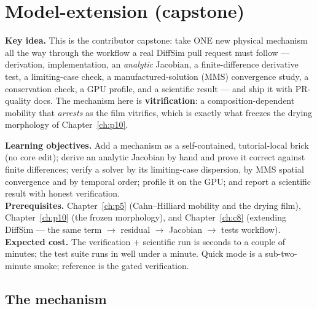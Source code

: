 \chapter{Model-extension (capstone)}
\label{ch:p11}

\begin{keybox}
\textbf{Key idea.} This is the contributor capstone: take ONE new physical
mechanism all the way through the workflow a real DiffSim pull request must
follow --- derivation, implementation, an \emph{analytic} Jacobian, a
finite-difference derivative test, a limiting-case check, a
manufactured-solution (MMS) convergence study, a conservation check, a GPU
profile, and a scientific result --- and ship it with PR-quality docs. The
mechanism here is \textbf{vitrification}: a composition-dependent mobility that
\emph{arrests} as the film vitrifies, which is exactly what freezes the drying
morphology of Chapter~\ref{ch:p10}.
\end{keybox}

\begin{keybox}
\textbf{Learning objectives.} Add a mechanism as a self-contained,
tutorial-local brick (no core edit); derive an analytic Jacobian by hand and
prove it correct against finite differences; verify a solver by its
limiting-case dispersion, by MMS spatial convergence and by temporal order;
profile it on the GPU; and report a scientific result with honest
verification.\\[2pt]
\textbf{Prerequisites.} Chapter~\ref{ch:p5} (Cahn--Hilliard mobility and the
drying film), Chapter~\ref{ch:p10} (the frozen morphology), and
Chapter~\ref{ch:c8} (extending DiffSim --- the same term $\rightarrow$ residual
$\rightarrow$ Jacobian $\rightarrow$ tests workflow).\\[2pt]
\textbf{Expected cost.} The verification + scientific run is seconds to a couple
of minutes; the test suite runs in well under a minute. Quick mode is a
sub-two-minute smoke; reference is the gated verification.
\end{keybox}

\section{The mechanism}

